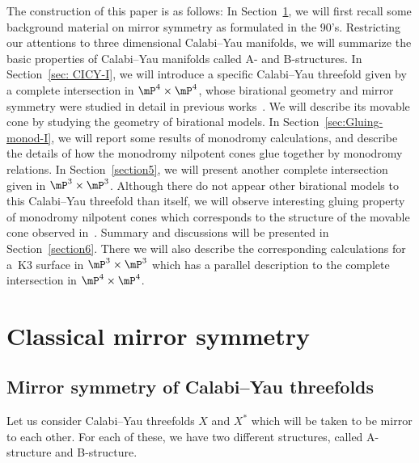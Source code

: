 \documentclass[10pt,a4paper]{amsart}
\numberwithin{equation}{section}
\begin{document}
The construction of this paper is as follows: In Section~\ref{sec:Classical-MS}, we will first recall some background material on mirror symmetry as formulated in the 90's. Restricting our attentions to three dimensional Calabi--Yau manifolds, we will summarize the basic properties of Calabi--Yau manifolds called A- and B-structures. In Section~\ref{sec: CICY-I}, we will introduce a specific Calabi--Yau threefold given by a complete intersection in $\mP^{4}\times\mP^{4}$, whose birational geometry and mirror symmetry were studied in detail in previous works~\cite{HTcmp, HTjag}. We will describe its movable cone by studying the geometry of birational models. In Section~\ref{sec:Gluing-monod-I}, we will report some results of monodromy calculations, and describe the details of how the monodromy nilpotent cones glue together by monodromy relations. In Section~\ref{section5}, we will present another complete intersection given in $\mP^{3}\times\mP^{3}$. Although there do not appear other birational models to this Calabi--Yau threefold than itself, we will observe interesting gluing property of monodromy nilpotent cones which corresponds to the structure of the movable cone observed in~\cite{Oguiso1}. Summary and discussions will be presented in Section~\ref{section6}. There we will also describe the corresponding calculations for a~K3 surface in $\mP^{3}\times\mP^{3}$ which has a parallel description to the complete intersection in $\mP^{4}\times\mP^{4}$.

\section{Classical mirror symmetry} \label{sec:Classical-MS}

\subsection{Mirror symmetry of Calabi--Yau threefolds}

Let us consider Calabi--Yau threefolds $X$ and $X^{*}$ which will be taken to be mirror to each other. For each of these, we have two different structures, called A-structure and B-structure.
\end{document}
